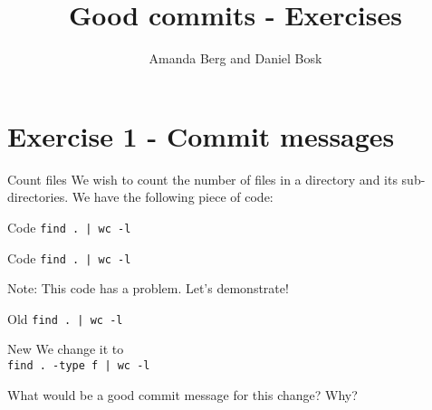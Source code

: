 \title{%
  Good commits - Exercises
}
\author{Amanda Berg and Daniel Bosk}


\mode*


\section{Exercise 1 - Commit messages}
\begin{frame}
\begin{block}{Count files}
    We wish to count the number of files in a directory and its sub-directories. We have the following piece of code:
\end{block}
\begin{block}{Code}
    \lstinline{find . | wc -l}
\end{block}
\end{frame}

\begin{frame}
\begin{block}{Code}
    \lstinline{find . | wc -l}
\end{block}

\begin{alertblock}{Note:}
    This code has a problem. Let's demonstrate!
\end{alertblock}
\end{frame}


\begin{frame}
\begin{block}{Old}
    \lstinline{find . | wc -l}
\end{block}

\begin{block}{New}
    We change it to \\
    \lstinline{find . -type f | wc -l}
\end{block}
\end{frame}

\begin{frame}
\begin{question}
What would be a good commit message for this change? Why? %
\end{question}    
\end{frame}

